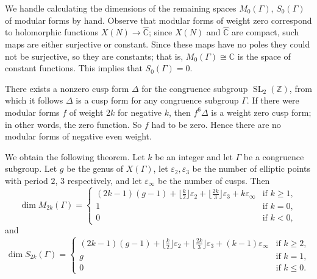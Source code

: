 \documentclass[11pt,leqno]{article}
\theoremstyle{plain}
\theoremstyle{definition}
\numberwithin{equation}{section}
\numberwithin{lem}{section}
\DeclareMathOperator{\SL}{SL}
\begin{document}
We handle calculating the dimensions of the remaining spaces $M_0(\Gamma)$, $S_0(\Gamma)$ of modular forms by hand. Observe that modular forms of weight zero correspond to holomorphic functions $X(N)\to\widehat{\mathbb C}$; since $X(N)$ and $\widehat{\mathbb C}$ are compact, such maps are either surjective or constant. Since these maps have no poles they could not be surjective, so they are constants; that is, $M_0(\Gamma)\cong \mathbb C$ is the space of constant functions. This implies that $S_0(\Gamma) = 0$. 

There exists a nonzero cusp form $\Delta$ for the congruence subgroup $\SL_2(\mathbb Z)$, from which it follows $\Delta$ is a cusp form for any congruence subgroup $\Gamma$. If there were modular forms $f$ of weight $2k$ for negative $k$, then $f^6\Delta$ is a weight zero cusp form; in other words, the zero function. So $f$ had to be zero. Hence there are no modular forms of negative even weight.

We obtain the following theorem. Let $k$ be an integer and let $\Gamma$ be a congruence subgroup. Let $g$ be the genus of $X(\Gamma)$, let $\varepsilon_2,\varepsilon_3$ be the number of elliptic points with period $2$, $3$ respectively, and let $\varepsilon_\infty$ be the number of cusps. Then
\[\dim  M_{2k}(\Gamma) = \begin{cases}
    (2k-1)(g-1) + \lfloor\frac{k}{2}\rfloor\varepsilon_2 + \lfloor\frac{2k}{3}\rfloor\varepsilon_3 + k\varepsilon_\infty & \text{if $k\geq 1$},\\
    1 & \text{if $k = 0$},\\
    0 & \text{if $k<0$},
\end{cases}\]
and
\[\dim  S_{2k}(\Gamma) = \begin{cases}
    (2k-1)(g-1) + \lfloor\frac{k}{2}\rfloor\varepsilon_2 + \lfloor\frac{2k}{3}\rfloor\varepsilon_3 + (k-1)\varepsilon_\infty & \text{if $k\geq 2$},\\
    g & \text{if $k = 1$},\\
    0 & \text{if $k\leq 0$}.
\end{cases}\]
\end{document}
